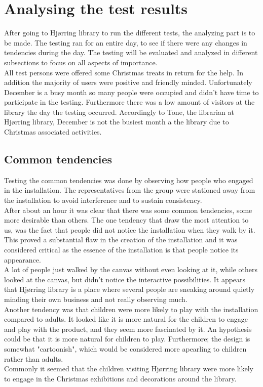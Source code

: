\section{Analysing the test results}
After going to Hj{\o}rring library to run the different tests, the analyzing part is to be made. The testing ran for an entire day, to see if there were any changes in tendencies during the day. The testing will be evaluated and analyzed in different subsections to focus on all aspects of importance. \\
All test persons were offered some Christmas treats in return for the help. In addition the majority of users were positive and friendly minded. Unfortunately December is a busy month so many people were occupied and didn't have time to participate in the testing. Furthermore there was a low amount of visitors at the library the day the testing occurred. Accordingly to Tone, the librarian at Hj{\o}rring library, December is not the busiest month a the library due to Christmas associated activities.

\subsection{Common tendencies}
Testing the common tendencies was done by observing how people who engaged in the installation. The representatives from the group were stationed away from the installation to avoid interference and to sustain consistency.\\ 
After about an hour it was clear that there was some common tendencies, some more desirable than others. The one tendency that draw the most attention to us, was the fact that people did not notice the installation when they walk by it. This proved a substantial flaw in the creation of the installation and it was considered critical as the essence of the installation is that people notice its appearance.\\
A lot of people just walked by the canvas without even looking at it, while others looked at the canvas, but didn't notice the interactive possibilities. It appears that Hj{\o}rring library is a place where several people are sneaking around quietly minding their own business and not really observing much.\\
Another tendency was that children were more likely to play with the installation compared to adults. It looked like it is more natural for the children to engage and play with the product, and they seem more fascinated by it. An hypothesis could be that it is more natural for children to play. Furthermore; the design is somewhat "cartoonish", which would be considered more apearling to children rather than adults.\\
Commonly it seemed that the children visiting Hj{\o}rring library were more likely to engage in the Christmas exhibitions and decorations around the library.

